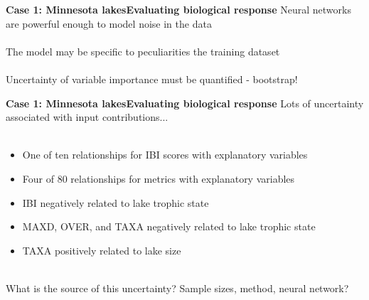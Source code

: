\documentclass[serif]{beamer}\usepackage[]{graphicx}\usepackage[]{color}
\begin{document}
\begin{frame}{\textbf{Case 1: Minnesota lakes}}{\textbf{Evaluating biological response}}
\onslide<+->
Neural networks are powerful enough to model noise in the data \\~\\
The model may be specific to peculiarities the training dataset \\~\\
Uncertainty of variable importance must be quantified - bootstrap! 
\onslide<+->
\begin{center}
\begin{figure}[t]
\end{figure} %
\end{center}
\end{frame}

\begin{frame}{\textbf{Case 1: Minnesota lakes}}{\textbf{Evaluating biological response}}
Lots of uncertainty associated with input contributions... \\~\\
\begin{itemize}
\item One of ten relationships for IBI scores with explanatory variables
\item Four of 80 relationships for metrics with explanatory variables
\pause
\item IBI negatively related to lake trophic state
\item MAXD, OVER, and TAXA negatively related to lake trophic state
\item TAXA positively related to lake size\\~\\
\end{itemize}
\pause
What is the source of this uncertainty? Sample sizes, method, neural network?
\end{frame}
\end{document}
